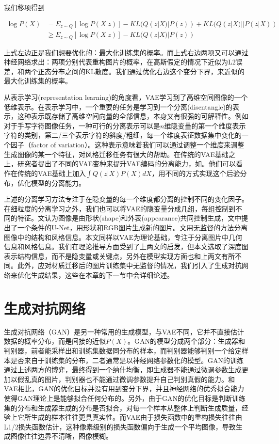 \documentclass[UTF8,openany,AutoFakeBold,AutoFakeSlant,cs4size]{ctexbook}
\begin{document}
我们移项得到

\begin{equation}
	\begin{aligned}
		\log P(X) &= E_{z \sim Q}[\log P(X|z)] - KL(Q(z|X) | P(z)) + KL(Q(z|X) || P(z|X)) \\
		&\geq E_{z \sim Q}[\log P(X|z)] - KL(Q(z|X) | P(z))
	\end{aligned}
\end{equation}

上式左边正是我们想要优化的：最大化训练集的概率。而上式右边两项又可以通过神经网络求出：两项分别代表重构图片的概率，在高斯假定的情况下近似为L2误差，和两个正态分布之间的KL散度。我们通过优化右边这个变分下界，来近似的最大化训练集的概率。

从表示学习(representation learning)的角度看，VAE学习到了高维空间图像的一个低维表示。在表示学习中，一个重要的任务是学习到一个分离(disentangle)的表示，这种表示既存储了高维空间向量的全部信息，本身又有很强的可解释性。例如对于手写字符图像任务，一种可行的分离表示可以是$n$维隐变量的第一个维度表示字符的类别，第二/三个表示字符的斜度/粗细，每一个维度表征数据集中变化的一个因子（factor of variation）。这种表示意味着我们可以通过调整一个维度来调整生成图像的某一个特征，对风格迁移任务有很大的帮助。在传统的VAE基础之上，研究者提出了不同的VAE变种来提升VAE编码的分离能力，如\cite{Burgess2018UnderstandingDI, RubSchTol18b}。他们可以看作在传统的VAE基础上加入$\int Q(z|X) P(X) dX$，用不同的方式实现这个后验分布，优化模型的分离能力。

上述的分离学习方法专注于在隐变量的每一个维度都分离的控制不同的变化因子。在细粒度的分离学习之外，我们也可以将VAE的隐变量分成几组，每组控制到不同的特征。\cite{vunet2018}文认为图像是由形状(shape)和外表(appearance)共同控制生成，文中提出了一个条件的U-Net，用形状和RGB图片生成新的图片。\cite{Wu2019DisentanglingCA}文用无监督的方法分离图像中的结构和风格信息。本文同样以VAE为理论基础，专注于分离图片中几何信息和风格信息。我们在理论推导方面受到了上两文的启发，但本文选取了深度图表示结构信息，而不是隐变量\cite{vunet2018}或关键点\cite{Wu2019DisentanglingCA}，另外在模型实现方面也和上两文有所不同。此外，应对材质迁移后的图片训练集中无监督的情况，我们引入了生成对抗网络来优化生成结果，这些在本章的下一节中会详细论述。

\section{生成对抗网络}

生成对抗网络（GAN）\cite{NIPS2014_5423}是另一种常用的生成模型，与VAE不同，它并不直接估计数据的概率分布，而是间接的近似$P(X)$。GAN的模型分成两个部分：生成器和判别器，前者能采样出和训练集数据同分布的样本，而判别器能够判别一个给定样本是否来自于训练集的分布，二者通常是以神经网络参数化的模型。GAN的训练通过上述两方的博弈，最终得到一个纳什均衡，即生成器不能通过微调参数生成更加以假乱真的图片，判别器也不能通过微调参数提升自己判别真假的能力。和VAE相比，GAN的优化目标并没有用到变分下界，并且神经网络的优秀拟合能力使得GAN理论上是能够拟合任何分布的。另外，由于GAN的优化目标是判断训练集的分布和生成器生成的分布是否拟合，对每一个样本从整体上判断生成质量，经验上它所生成的样本往往更具真实性。而VAE由于损失函数中的重构损失往往由L1/2损失函数估计，这种像素级别的损失函数偏向于生成一个平均图像，导致生成图像往往边界不清晰，图像模糊。
\end{document}
